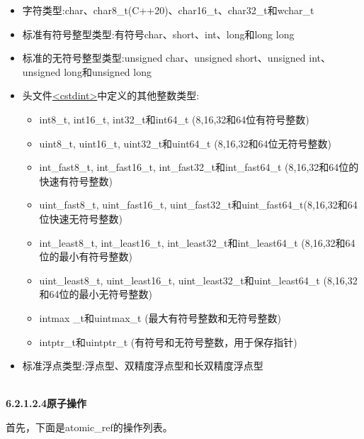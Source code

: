 \begin{itemize}
\item 
字符类型:char、char8\_t(C++20)、char16\_t、char32\_t和wchar\_t

\item 
标准有符号整型类型:有符号char、short、int、long和long long

\item 
标准的无符号整型类型:unsigned char、unsigned short、unsigned int、unsigned long和unsigned long

\item 
头文件\href{http://en.cppreference.com/w/cpp/header/cstdint}{<cstdint>}中定义的其他整数类型:
\begin{itemize}
\item 
int8\_t, int16\_t, int32\_t和int64\_t (8,16,32和64位有符号整数)

\item 
uint8\_t, uint16\_t, uint32\_t和uint64\_t (8,16,32和64位无符号整数)

\item 
int\_fast8\_t, int\_fast16\_t, int\_fast32\_t和int\_fast64\_t (8,16,32和64位的快速有符号整数)

\item 
uint\_fast8\_t, uint\_fast16\_t, uint\_fast32\_t和uint\_fast64\_t(8,16,32和64位快速无符号整数)

\item 
int\_least8\_t, int\_least16\_t, int\_least32\_t和int\_least64\_t (8,16,32和64位的最小有符号整数)

\item 
uint\_least8\_t, uint\_least16\_t, uint\_least32\_t和uint\_least64\_t (8,16,32和64位的最小无符号整数)

\item 
intmax \_t和uintmax\_t (最大有符号整数和无符号整数)

\item 
intptr\_t和uintptr\_t (有符号和无符号整数，用于保存指针)
\end{itemize}

\item 
标准浮点类型:浮点型、双精度浮点型和长双精度浮点型
\end{itemize}

\hspace*{\fill} \\ %
\noindent
\textbf{6.2.1.2.4\hspace{0.2cm}原子操作}

首先，下面是atomic\_ref的操作列表。

